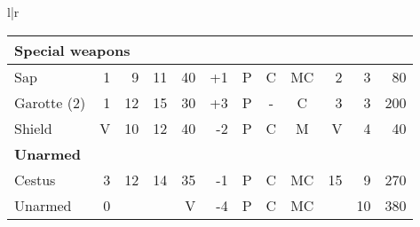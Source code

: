 \begin{tabular}[t]{l|r}
\begin{minipage}[t]{4.8in}
\begin{tabularx}{\linewidth}[t]{Xrrrrrcccrrr}
\multicolumn{12}{l}{\textbf{Special weapons}} \\ \hline
Sap\footnotemark		& 1	& 9	& 11	& 40	& +1	& P	& C	& MC	& 2	& 3	& 80 \\ \hline
Garotte (2)\footnotemark	& 1	& 12	& 15	& 30	& +3	& P	& -	& C	& 3	& 3	& 200 \\ \hline
Shield				& V	& 10	& 12	& 40	& -2	& P	& C	& M	& V	& 4	& 40 \\ \hline

\multicolumn{12}{l}{\textbf{Unarmed}} \\ \hline
Cestus\footnotemark		& 3	& 12	& 14	& 35	& -1	& P	& C	& MC	& 15	& 9	& 270 \\ \hline
Unarmed\footnotemark		& 0	&	&	& V	& -4	& P	& C	& MC	& 	& 10	& 380 \\ \hline 
\end{tabularx}
\end{minipage}
\end{tabular}

\newpage

